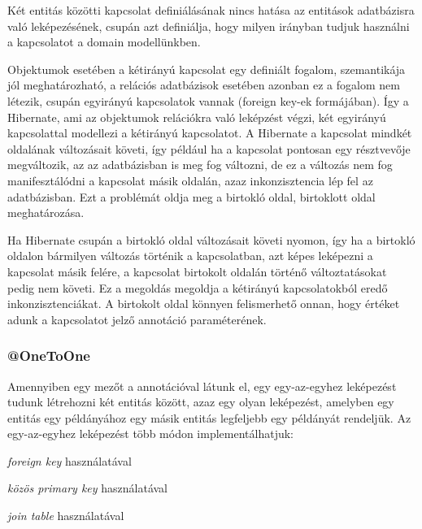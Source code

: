 Két entitás közötti kapcsolat definiálásának nincs hatása az entitások adatbázisra való leképezésének, csupán azt definiálja, hogy milyen irányban tudjuk használni a kapcsolatot a domain modellünkben. \par

Objektumok esetében a kétirányú kapcsolat egy definiált fogalom, szemantikája jól meghatározható, a relációs adatbázisok esetében azonban ez a fogalom nem létezik, csupán egyirányú kapcsolatok vannak (foreign key-ek formájában). Így a Hibernate, ami az objektumok relációkra való leképzést végzi, két egyirányú kapcsolattal modellezi a kétirányú kapcsolatot. A Hibernate a kapcsolat mindkét oldalának változásait követi, így például ha a kapcsolat pontosan egy résztvevője megváltozik, az az adatbázisban is meg fog változni, de ez a változás nem fog manifesztálódni a kapcsolat másik oldalán, azaz inkonzisztencia lép fel az adatbázisban. Ezt a problémát oldja meg a birtokló oldal, birtoklott oldal meghatározása. \par

Ha Hibernate csupán a birtokló oldal változásait követi nyomon, így ha a birtokló oldalon bármilyen változás történik a kapcsolatban, azt képes leképezni a kapcsolat másik felére, a kapcsolat birtokolt oldalán történő változtatásokat pedig nem követi. Ez a megoldás megoldja a kétirányú kapcsolatokból eredő inkonzisztenciákat. A birtokolt oldal könnyen felismerhető onnan, hogy értéket adunk a kapcsolatot jelző annotáció  paraméterének. \par

\subsubsection{@OneToOne}

Amennyiben egy mezőt a  annotációval látunk el, egy egy-az-egyhez leképezést tudunk létrehozni két entitás között, azaz egy olyan leképezést, amelyben egy entitás egy példányához egy másik entitás legfeljebb egy példányát rendeljük. Az egy-az-egyhez leképezést több módon implementálhatjuk:

\begin{listing}
	\item \emph{foreign key} használatával
	\item \emph{közös primary key} használatával
	\item \emph{join table} használatával
\end{listing}

